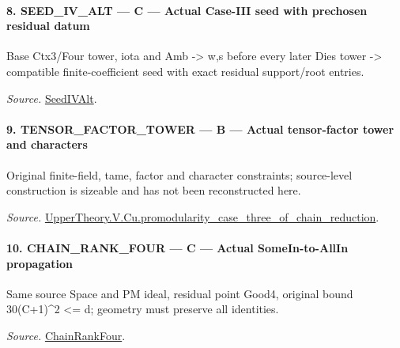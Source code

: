 \documentclass[11pt,a4paper]{article}
\numberwithin{equation}{section}
\theoremstyle{remark}\newtheorem{remark}[theorem]{Remark}
\begin{document}
\paragraph{8. SEED\_\allowbreak IV\_\allowbreak ALT — C — Actual Case-III seed with prechosen residual datum}

Base Ctx3/Four tower, iota and Amb -> w,s before every later Dies tower -> compatible finite-coefficient seed with exact residual support/root entries.

\emph{Source.} \href{https://github.com/CocoSgt/riemann-hypothesis-lean/blob/7cbf7a0c32fca1badf05931879a37c3f8a2b03b4/src/Development/AutomorphicArithmetic/AutomorphicVarieties/ModularityArgument/ThresholdArguments/DenseThresholdCases/PromodularityCaseThree.lean#L19-L25}{SeedIVAlt}.



\paragraph{9. TENSOR\_\allowbreak FACTOR\_\allowbreak TOWER — B — Actual tensor-factor tower and characters}

Original finite-field, tame, factor and character constraints; source-level construction is sizeable and has not been reconstructed here.

\emph{Source.} \href{https://github.com/CocoSgt/riemann-hypothesis-lean/blob/7cbf7a0c32fca1badf05931879a37c3f8a2b03b4/src/Development/AutomorphicArithmetic/AutomorphicVarieties/ModularityArgument/ThresholdArguments/DenseThresholdCases/PromodularityCaseThreeOfLemmas.lean#L131-L153}{UpperTheory.V.Cu.promodularity\_\allowbreak case\_\allowbreak three\_\allowbreak of\_\allowbreak chain\_\allowbreak reduction}.



\paragraph{10. CHAIN\_\allowbreak RANK\_\allowbreak FOUR — C — Actual SomeIn-to-AllIn propagation}

Same source Space and PM ideal, residual point Good4, original bound 30(C+1)\textasciicircum{}2 <= d; geometry must preserve all identities.

\emph{Source.} \href{https://github.com/CocoSgt/riemann-hypothesis-lean/blob/7cbf7a0c32fca1badf05931879a37c3f8a2b03b4/src/Development/AutomorphicArithmetic/AutomorphicVarieties/ModularityArgument/ThresholdArguments/DenseThresholdCases/PromodularityCaseThree.lean#L26-L32}{ChainRankFour}.
\end{document}

